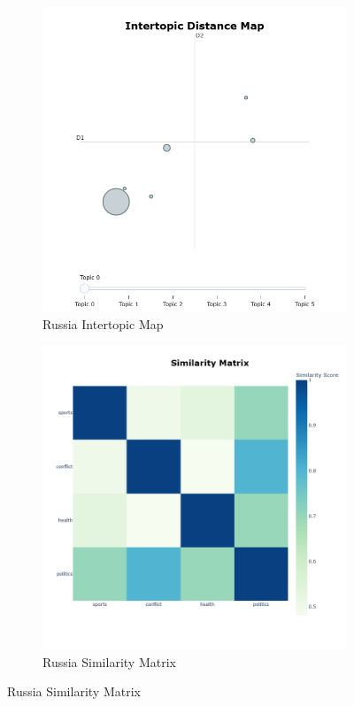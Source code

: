 \documentclass{article}
\theoremstyle{mytheoremstyle}
\theoremstyle{mytheoremstyle}
\theoremstyle{myproblemstyle}
\begin{document}
\begin{figure}[hp]
        \begin{subfigure}{0.45\textwidth}
            \includegraphics[width=\textwidth]{../images/plots/Russia/intertopic_distance_map_russia.png}
            \caption{Russia Intertopic Map}
            \label{fig:intertopic_russia}
        \end{subfigure}
        \hfill
        \begin{subfigure}{0.45\textwidth}
            \includegraphics[width=\textwidth]{../images/plots/Russia/similarity_matrix_russia.png}
            \caption{Russia Similarity Matrix}
            \label{fig:sim_russia}
        \end{subfigure}
                

\end{figure}
\end{document}
